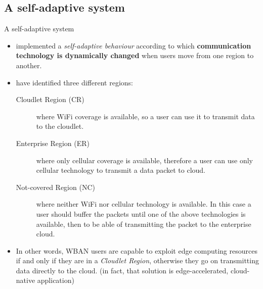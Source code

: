 \documentclass[10pt]{beamer}
\begin{document}
\subsection{A self-adaptive system}
\begin{frame}{A self-adaptive system} 

\begin{itemize}
\item \citet{MSAReport} implemented a \textit{self-adaptive behaviour} according to which \textbf{communication technology is dynamically changed} when users move from one region to another. 

\item \citet{MSAReport} have identified three different regions:\cite[par.~3.1]{MSAReport}
\begin{description}

\item[Cloudlet Region (CR)] where WiFi coverage is available, so a user can use it to transmit data to the cloudlet.

\item[Enterprise Region (ER)] where only cellular coverage is available, therefore  a user can use only cellular technology to transmit a data packet to cloud. 

\item[Not-covered Region (NC)] where neither WiFi nor cellular technology is available. In this case a user should buffer the packets until one of the above technologies is available, then to be able of transmitting the packet to the enterprise cloud. 

\end{description}

\item In other words, WBAN users are capable to exploit edge computing resources if and only if they are in a \textit{Cloudlet Region}, otherwise they go on transmitting data directly to the cloud. (in fact, that solution is edge-accelerated, cloud-native application)

\end{itemize}

\end{frame} 
\end{document}
